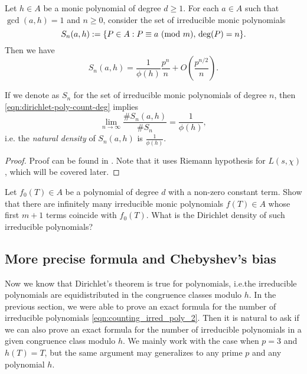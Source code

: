 \begin{corollary}
    Let $h \in A$ be a monic polynomial of degree $d \ge 1$.
    For each $a \in A$ such that $\gcd(a, h) = 1$ and $n \ge 0$, consider the set of irreducible monic polynomials
    \begin{equation}
        S_n(a, h) := \{P \in A : P \equiv a\ (\mathrm{mod}\ m), \,\deg(P) = n\}.
    \end{equation}
    Then we have
    \begin{equation}
        S_n(a, h) = \frac{1}{\phi(h)} \frac{p^n}{n} + O\left(\frac{p^{n/2}}{n}\right).
        \label{eqn:dirichlet-poly-count-deg}
    \end{equation}
\end{corollary}
If we denote as $S_n$ for the set of irreducible monic polynomials of degree $n$, then \eqref{eqn:dirichlet-poly-count-deg} implies
\[
\lim_{n \to \infty} \frac{\# S_n(a, h)}{\# S_n} = \frac{1}{\phi(h)},
\]
i.e. the \emph{natural density} of $S_n(a, h)$ is $\frac{1}{\phi(h)}$.
\begin{proof}
    Proof can be found in \cite[p. 40, Theorem 4.8]{rosen2013number}.
    Note that it uses Riemann hypothesis for $L(s, \chi)$, which will be covered later.
\end{proof}

\begin{exercise}
    Let $f_0(T) \in A$ be a polynomial of degree $d$ with a non-zero constant term.
    Show that there are infinitely many irreducible monic polynomials $f(T) \in A$ whose first $m + 1$ terms coincide with $f_0(T)$.
    What is the Dirichlet density of such irreducible polynomials?
\end{exercise}


\subsection{More precise formula and Chebyshev's bias}
\label{sec:dirichlet-more-precise}

Now we know that Dirichlet's theorem is true for polynomials, i.e.the irreducible polynomials are equidistributed in the congruence classes modulo $h$.
In the previous section, we were able to prove an exact formula for the number of irreducible polynomials \eqref{eqn:counting_irred_poly_2}.
Then it is natural to ask if we can also prove an exact formula for the number of irreducible polynomials in a given congruence class modulo $h$.
We mainly work with the case when $p = 3$ and $h(T) = T$, but the same argument may generalizes to any prime $p$ and any polynomial $h$.


